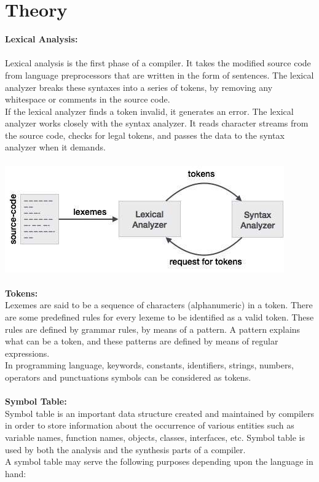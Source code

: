 \documentclass[10pt,a4paper]{article}
\begin{document}
\section{Theory}
\textbf{Lexical Analysis:}
\\\\
Lexical analysis is the first phase of a compiler. It takes the modified source code from language preprocessors that are written in the form of sentences. The lexical analyzer breaks these syntaxes into a series of tokens, by removing any whitespace or comments in the source code.
\\If the lexical analyzer finds a token invalid, it generates an error. The lexical analyzer works closely with the syntax analyzer. It reads character streams from the source code, checks for legal tokens, and passes the data to the syntax analyzer when it demands.
\\\\
\includegraphics[scale=0.5]{im1.png}
\\\\
\textbf{Tokens:}
\\Lexemes are said to be a sequence of characters (alphanumeric) in a token. There are some predefined rules for every lexeme to be identified as a valid token. These rules are defined by grammar rules, by means of a pattern. A pattern explains what can be a token, and these patterns are defined by means of regular expressions.
\\In programming language, keywords, constants, identifiers, strings, numbers, operators and punctuations symbols can be considered as tokens.
\\\\
\textbf{Symbol Table:}
\\Symbol table is an important data structure created and maintained by compilers in order to store information about the occurrence of various entities such as variable names, function names, objects, classes, interfaces, etc. Symbol table is used by both the analysis and the synthesis parts of a compiler.
\\A symbol table may serve the following purposes depending upon the language in hand:
\end{document}
